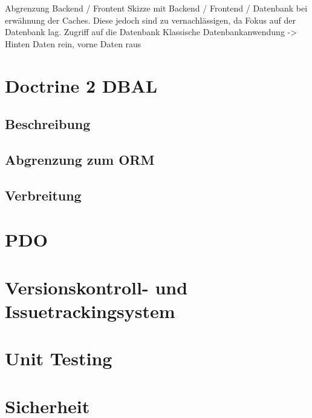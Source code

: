 		Abgrenzung Backend / Frontent
		Skizze mit Backend / Frontend / Datenbank bei erwähnung der Caches. Diese jedoch sind zu vernachlässigen, da
		Fokus auf der Datenbank lag.
		Zugriff auf die Datenbank
		Klassische Datenbankanwendung -> Hinten Daten rein, vorne Daten raus
\section{Doctrine 2 DBAL}
	\subsection{Beschreibung}
	\subsection{Abgrenzung zum ORM}
	\subsection{Verbreitung}
\section{PDO}
\section{Versionskontroll- und Issuetrackingsystem}

\section{Unit Testing}

\section{Sicherheit}
